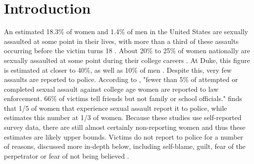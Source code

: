 \documentclass[AER,draftmode]{AEA}
\begin{document}









\clearpage
\section{Introduction}

An estimated 18.3\% of women and 1.4\% of men in the United States are sexually assaulted at some point in their lives, with more than a third of these assaults occurring before the victim turns 18  \cite{black_national_2011}. About 20\% to 25\% of women nationally are sexually assaulted at some point during their college careers \cite{fisher_sexual_2000}. At Duke, this figure is estimated at closer to 40\%, as well as 10\% of men \cite{fox_university_2017}. Despite this, very few assaults are reported to police. According to , "fewer than 5\% of attempted or completed sexual assault against college age women are reported to law enforcement. 66\% of victims tell friends but not family or school officials."  finds that 1/5 of women that experience sexual assault report it to police, while  estimates this number at 1/3 of women. Because these studies use self-reported survey data, there are still almost certainly non-reporting women and thus these estimates are likely upper bounds. Victims do not report to police for a number of reasons, discussed more in-depth below, including self-blame, guilt, fear of the perpetrator or fear of not being believed \cite{du_mont_role_2003}.
\end{document}
